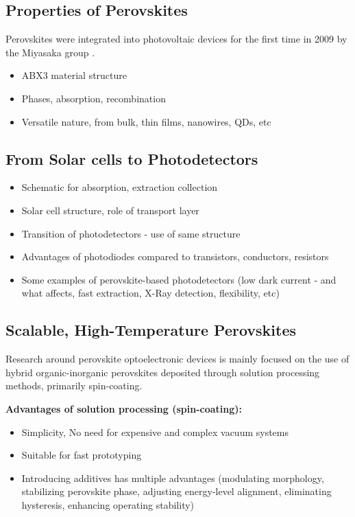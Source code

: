 \subsection{Properties of Perovskites}
Perovskites were integrated into photovoltaic devices for the first time in 2009 by the Miyasaka group \cite{Kojima2009OrganometalCells}.


\begin{itemize}
    \item ABX3 material structure 
    \item Phases, absorption, recombination
    \item Versatile nature, from bulk, thin films, nanowires, QDs, etc
\end{itemize}

\subsection{From Solar cells to Photodetectors}
\begin{itemize}
    \item Schematic for absorption, extraction collection
    \item Solar cell structure, role of transport layer
    \item Transition of photodetectors - use of same structure 
    \item Advantages of photodiodes compared to transistors, conductors, resistors 
    \item Some examples of perovskite-based photodetectors (low dark current - and what affects, fast extraction, X-Ray detection, flexibility, etc)
\end{itemize}

\subsection{Scalable, High-Temperature Perovskites}


Research around perovskite optoelectronic devices is mainly focused on the use of hybrid organic-inorganic perovskites deposited through solution processing methods, primarily spin-coating. 

\textbf{Advantages of solution processing (spin-coating): }

\begin{itemize}
    \item Simplicity, No need for expensive and complex vacuum systems
    \item Suitable for fast prototyping
    \item Introducing additives has multiple advantages (modulating morphology, stabilizing perovskite phase, adjusting energy-level alignment, eliminating hysteresis, enhancing operating stability)\cite{Liu2020ACells}
\end{itemize}



